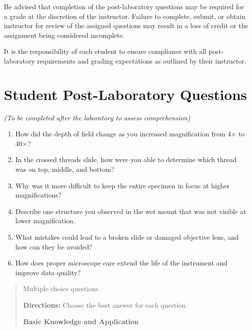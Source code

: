 \documentclass[
  letterpaper,
  DIV=11,
  numbers=noendperiod]{scrreprt}
\begin{document}
Be advised that completion of the post-laboratory questions may be
required for a grade at the discretion of the instructor. Failure to
complete, submit, or obtain instructor for review of the assigned
questions may result in a loss of credit or the assignment being
considered incomplete.

It is the responsibility of each student to ensure compliance with all
post-laboratory requirements and grading expectations as outlined by
their instructor.

\section{\texorpdfstring{\textbf{Student Post-Laboratory
Questions}}{Student Post-Laboratory Questions}}\label{student-post-laboratory-questions}

\emph{(To be completed after the laboratory to assess comprehension)}

\begin{enumerate}
\def\labelenumi{\arabic{enumi}.}
\item
  How did the depth of field change as you increased magnification from
  4× to 40×?
\item
  In the crossed threads slide, how were you able to determine which
  thread was on top, middle, and bottom?
\item
  Why was it more difficult to keep the entire specimen in focus at
  higher magnifications?
\item
  Describe one structure you observed in the wet mount that was not
  visible at lower magnification.
\item
  What mistakes could lead to a broken slide or damaged objective lens,
  and how can they be avoided?
\item
  How does proper microscope care extend the life of the instrument and
  improve data quality?
\end{enumerate}

\begin{quote}
Multiple choice questions

\textbf{Directions:} Choose the best answer for each question.

\textbf{Basic Knowledge and Application}
\end{quote}
\end{document}
